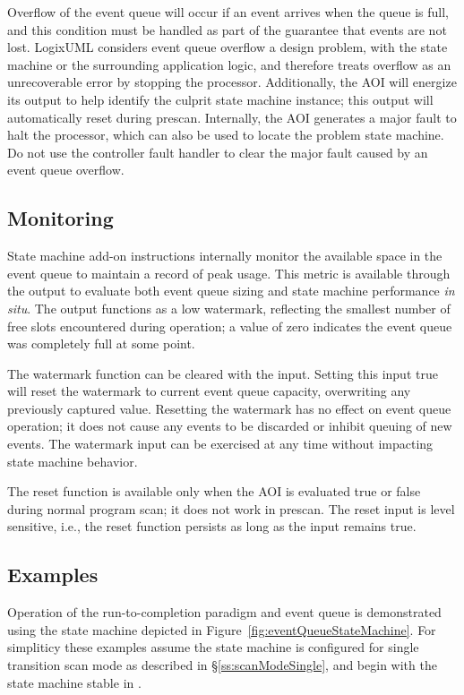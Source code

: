 Overflow of the event queue will occur if an event arrives when the queue
is full, and this condition must be handled as part of the guarantee that
events are not lost.
LogixUML considers event queue overflow a design problem,
with the state machine or the surrounding application logic, and
therefore treats overflow as an unrecoverable error by stopping the processor.
Additionally, the AOI will energize its 
output to help identify the culprit state machine instance; this output
will automatically reset during prescan. Internally, the AOI generates
a major fault to halt the processor, which can also be used to locate the
problem state machine. Do not use the controller fault handler
to clear the major fault caused by an event queue overflow.


\subsection{Monitoring}

State machine add-on instructions internally monitor the available space in
the event queue to maintain a record of peak usage. This metric is
available through the  output
to evaluate both event queue sizing and state machine performance
\emph{in situ}. The output functions as a low
watermark, reflecting the smallest number of free slots encountered during
operation; a value of zero indicates the event queue was completely
full at some point.

The watermark function can be cleared with the
 input. Setting this input true will
reset the watermark to current event queue capacity, overwriting any
previously captured value. Resetting the watermark has no effect on event
queue operation; it does not cause any events to be discarded or inhibit
queuing of new events. The watermark input can be exercised at any
time without impacting state machine behavior.

The reset function is available only when the
AOI is evaluated true or false during normal program scan; it does not
work in prescan. The reset input is level sensitive, i.e., the reset
function persists as long as the input remains true.


\subsection{Examples}

Operation of the run-to-completion paradigm and event queue is
demonstrated using the state machine depicted in
Figure~\ref{fig:eventQueueStateMachine}. For simpliticy these examples
assume the state machine is configured for single transition scan mode
as described in \S\ref{ss:scanModeSingle},
and begin with the state machine stable in .

